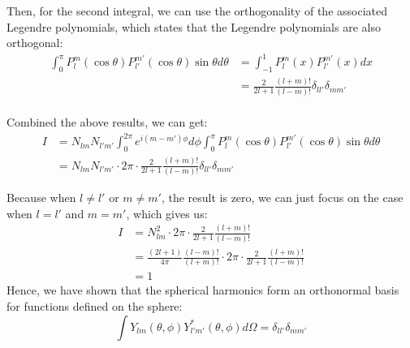 \begin{foundation}
    Then, for the second integral, we can use the orthogonality of the associated Legendre polynomials, which states that the Legendre polynomials are also orthogonal:
    \begin{align*}
        \int^\pi_0 P_l^m(\cos \theta) P_{l'}^{m'}(\cos \theta) \sin \theta d\theta &= \int^1_{-1} P_l^m(x) P_{l'}^{m'}(x) dx \\
        &= \frac{2}{2l + 1} \frac{(l + m)!}{(l - m)!} \delta_{ll'} \delta_{mm'}
    \end{align*} \\

    Combined the above results, we can get:
    \begin{align*}
        I &= N_{lm} N_{l'm'} \int^{2\pi}_0 e^{i (m - m') \phi} d\phi \int^\pi_0 P_l^m(\cos \theta) P_{l'}^{m'}(\cos \theta) \sin \theta d\theta \\
        &= N_{lm} N_{l'm'} \cdot 2\pi \cdot \frac{2}{2l + 1} \frac{(l + m)!}{(l - m)!} \delta_{ll'} \delta_{mm'}
    \end{align*}

    Because when $l \neq l'$ or $m \neq m'$, the result is zero, we can just focus on the case when $l = l'$ and $m = m'$, which gives us:
    \begin{align*}
        I &= N_{lm}^2 \cdot 2\pi \cdot \frac{2}{2l + 1} \frac{(l + m)!}{(l - m)!} \\
        &= \frac{(2l + 1)}{4\pi} \frac{(l - m)!}{(l + m)!} \cdot 2\pi \cdot \frac{2}{2l + 1} \frac{(l + m)!}{(l - m)!} \\
        &= 1
    \end{align*}
    Hence, we have shown that the spherical harmonics form an orthonormal basis for functions defined on the sphere:
    \[
        \int Y_{lm}(\theta, \phi) Y_{l'm'}^*(\theta, \phi) d\Omega = \delta_{ll'} \delta_{mm'}
    \] \\


\end{foundation}
